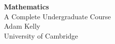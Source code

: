 \thispagestyle{empty}
\begin{center}
\vspace*{3cm}
{\Huge\bfseries Mathematics}\\[0.4cm]
{\Large A Complete Undergraduate Course}\\[2cm]
{\large Adam Kelly}\\[6cm]
{\large University of Cambridge}
\end{center}
\cleardoublepage
